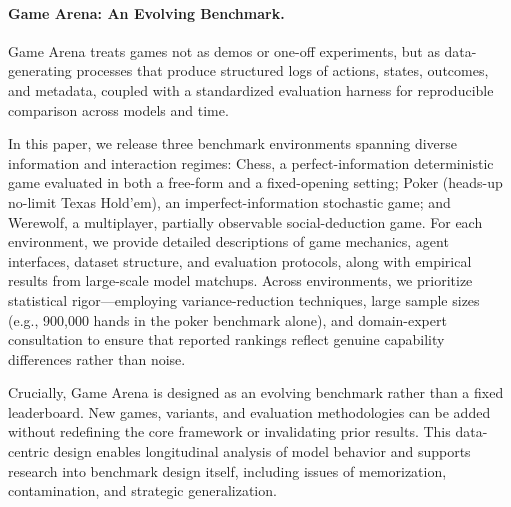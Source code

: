 \documentclass{article}
\begin{document}
\paragraph{Game Arena: An Evolving Benchmark.}

Game Arena treats games not as demos or one-off experiments, but as
data-generating processes that produce structured logs of actions, states,
outcomes, and metadata, coupled with a standardized evaluation harness for
reproducible comparison across models and time.

In this paper, we release three benchmark environments spanning diverse
information and interaction regimes: Chess, a perfect-information deterministic
game evaluated in both a free-form and a fixed-opening setting; Poker
(heads-up no-limit Texas Hold'em), an imperfect-information stochastic game;
and Werewolf, a multiplayer, partially observable social-deduction game. For
each environment, we provide detailed descriptions of game mechanics, agent
interfaces, dataset structure, and evaluation protocols, along with empirical
results from large-scale model matchups. Across environments, we prioritize
statistical rigor---employing variance-reduction techniques, large sample sizes
(e.g., 900{,}000 hands in the poker benchmark alone), and domain-expert
consultation to ensure that reported rankings reflect genuine capability
differences rather than noise.

Crucially, Game Arena is designed as an evolving benchmark rather than a fixed
leaderboard. New games, variants, and evaluation methodologies can be added
without redefining the core framework or invalidating prior results. This
data-centric design enables longitudinal analysis of model behavior and
supports research into benchmark design itself, including issues of
memorization, contamination, and strategic generalization.
\end{document}
